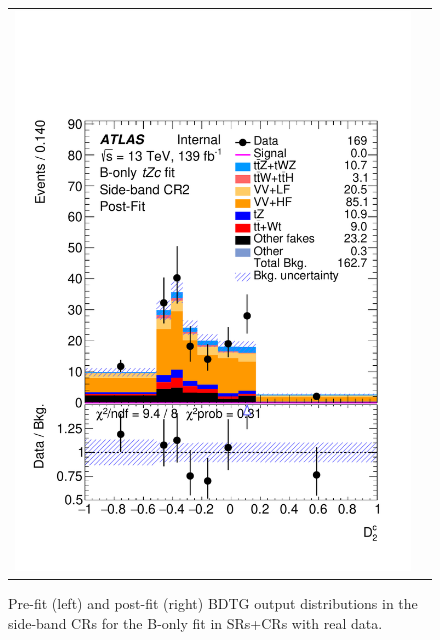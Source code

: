 \begin{figure}[htbp]
\begin{tabular}{cc}
		\includegraphics[width=.45\textwidth]{Chapters/CH8/figures/BONLY_CRSR_DL1rc_unblind/Plots/SBCR2_postFit} \\
	\end{tabular}
	\caption{Pre-fit (left) and post-fit (right) BDTG output distributions in the side-band CRs for the B-only \tZc fit in SRs+CRs with real data.
		\ErrStatSys
	}%
	\label{fig:stat:tzc:splusb:crsr:crplots:1_unb}
\end{figure}

